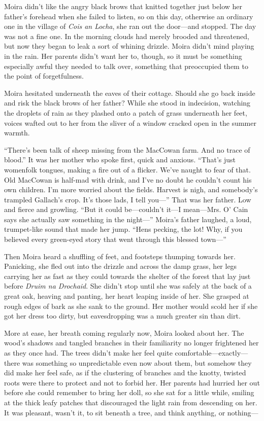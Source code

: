 \documentclass[letterpaper, twoside, 12pt]{memoir}
\begin{document}
Moira didn’t like the angry black brows that knitted together just below her father’s forehead when she failed to listen, so on this day, otherwise an ordinary one in the village of \textit{Cois an Locha}, she ran out the door---and stopped.
The day was not a fine one. In the morning clouds had merely brooded and threatened, but now they began to leak a sort of whining drizzle. Moira didn’t mind playing in the rain. Her parents didn’t want her to, though, so it must be something especially awful they needed to talk over, something that preoccupied them to the point of forgetfulness.

Moira hesitated underneath the eaves of their cottage. Should she go back inside and risk the black brows of her father? While she stood in indecision, watching the droplets of rain as they plashed onto a patch of grass underneath her feet, voices wafted out to her from the sliver of a window cracked open in the summer warmth.

“There’s been talk of sheep missing from the MacCowan farm. And no trace of blood.” It was her mother who spoke first, quick and anxious.
“That’s just womenfolk tongues, making a fire out of a flicker. We’ve naught to fear of that. Old MacCowan is half-mad with drink, and I’ve no doubt he couldn’t count his own children. I’m more worried about the fields. Harvest is nigh, and somebody’s trampled Gallach’s crop. It’s those lads, I tell you---” That was her father. Low and fierce and growling.
“But it could be---couldn’t it---I mean---Mrs. O’ Cain says she actually saw something in the night---”
Moira’s father laughed, a loud, trumpet-like sound that made her jump. “Hens pecking, the lot! Why, if you believed every green-eyed story that went through this blessed town---” 

Then Moira heard a shuffling of feet, and footsteps thumping towards her. Panicking, she fled out into the drizzle and across the damp grass, her legs carrying her as fast as they could towards the shelter of the forest that lay just before \textit{Druim na Drochaid}. 
She didn’t stop until she was safely at the back of a great oak, heaving and panting, her heart leaping inside of her. She grasped at rough edges of bark as she sank to the ground. Her mother would scold her if she got her dress too dirty, but eavesdropping was a much greater sin than dirt.

More at ease, her breath coming regularly now, Moira looked about her. The wood’s shadows and tangled branches in their familiarity no longer frightened her as they once had. The trees didn’t make her feel quite comfortable---exactly---there was something so unpredictable even now about them, but somehow they did make her feel safe, as if the clustering of branches and the knotty, twisted roots were there to protect and not to forbid her.
Her parents had hurried her out before she could remember to bring her doll, so she sat for a little while, smiling at the thick leafy patches that discouraged the light rain from descending on her. It was pleasant, wasn’t it, to sit beneath a tree, and think anything, or nothing---
\end{document}

